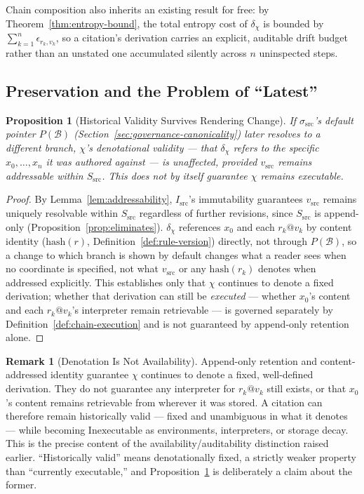 \documentclass[11pt]{article}
\newtheorem{proposition}[theorem]{Proposition}
\theoremstyle{definition}
\newtheorem{remark}[theorem]{Remark}
\begin{document}
Chain composition also inherits an existing result for free: by Theorem~\ref{thm:entropy-bound}, the total entropy cost of $\delta_\chi$ is bounded by $\sum_{k=1}^n \epsilon_{r_k,v_k}$, so a citation's derivation carries an explicit, auditable drift budget rather than an unstated one accumulated silently across $n$ uninspected steps.

\subsection{Preservation and the Problem of ``Latest''}

\begin{proposition}[Historical Validity Survives Rendering Change]
\label{prop:historical-validity}
If $\sigma_{\mathrm{src}}$'s default pointer $P(\mathcal{B})$ (Section~\ref{sec:governance-canonicality}) later resolves to a different branch, $\chi$'s \emph{denotational} validity --- that $\delta_\chi$ refers to the specific $x_0, \ldots, x_n$ it was authored against --- is unaffected, provided $v_{\mathrm{src}}$ remains addressable within $S_{\mathrm{src}}$. This does not by itself guarantee $\chi$ remains \emph{executable}.
\end{proposition}
\begin{proof}
By Lemma~\ref{lem:addressability}, $I_{\mathrm{src}}$'s immutability guarantees $v_{\mathrm{src}}$ remains uniquely resolvable within $S_{\mathrm{src}}$ regardless of further revisions, since $S_{\mathrm{src}}$ is append-only (Proposition~\ref{prop:eliminates}). $\delta_\chi$ references $x_0$ and each $r_k@v_k$ by content identity ($\mathrm{hash}(r)$, Definition~\ref{def:rule-version}) directly, not through $P(\mathcal{B})$, so a change to which branch is shown by default changes what a reader sees when no coordinate is specified, not what $v_{\mathrm{src}}$ or any $\mathrm{hash}(r_k)$ denotes when addressed explicitly. This establishes only that $\chi$ continues to denote a fixed derivation; whether that derivation can still be \emph{executed} --- whether $x_0$'s content and each $r_k@v_k$'s interpreter remain retrievable --- is governed separately by Definition~\ref{def:chain-execution} and is not guaranteed by append-only retention alone.
\end{proof}

\begin{remark}[Denotation Is Not Availability]
Append-only retention and content-addressed identity guarantee $\chi$ continues to denote a fixed, well-defined derivation. They do not guarantee any interpreter for $r_k@v_k$ still exists, or that $x_0$'s content remains retrievable from wherever it was stored. A citation can therefore remain historically valid --- fixed and unambiguous in what it denotes --- while becoming $\mathrm{Inexecutable}$ as environments, interpreters, or storage decay. This is the precise content of the availability/auditability distinction raised earlier. ``Historically valid'' means denotationally fixed, a strictly weaker property than ``currently executable,'' and Proposition~\ref{prop:historical-validity} is deliberately a claim about the former.
\end{remark}
\end{document}
